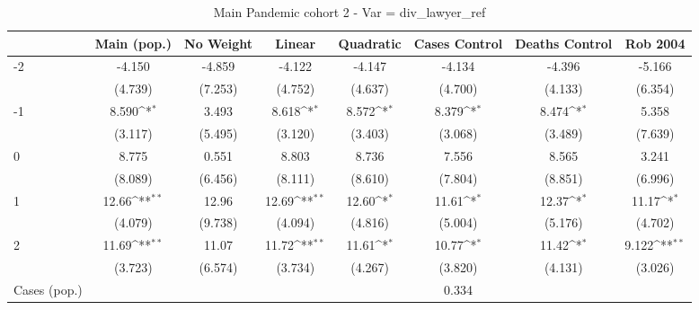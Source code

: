 \documentclass{article}
\begin{document}
{
\def\sym#1{\ifmmode^{#1}\else\(^{#1}\)\fi}
\begin{longtable}{l*{7}{c}}
\caption{Main Pandemic cohort 2 - Var = div\_lawyer\_ref}\\
\hline\hline\endfirsthead\hline\endhead\hline\endfoot\endlastfoot
                &\multicolumn{1}{c}{Main (pop.)}&\multicolumn{1}{c}{No Weight}&\multicolumn{1}{c}{Linear}&\multicolumn{1}{c}{Quadratic}&\multicolumn{1}{c}{Cases Control}&\multicolumn{1}{c}{Deaths Control}&\multicolumn{1}{c}{Rob 2004}\\
\hline
-2              &   -4.150         &   -4.859         &   -4.122         &   -4.147         &   -4.134         &   -4.396         &   -5.166         \\
                &  (4.739)         &  (7.253)         &  (4.752)         &  (4.637)         &  (4.700)         &  (4.133)         &  (6.354)         \\
-1              &    8.590\sym{*}  &    3.493         &    8.618\sym{*}  &    8.572\sym{*}  &    8.379\sym{*}  &    8.474\sym{*}  &    5.358         \\
                &  (3.117)         &  (5.495)         &  (3.120)         &  (3.403)         &  (3.068)         &  (3.489)         &  (7.639)         \\
0               &    8.775         &    0.551         &    8.803         &    8.736         &    7.556         &    8.565         &    3.241         \\
                &  (8.089)         &  (6.456)         &  (8.111)         &  (8.610)         &  (7.804)         &  (8.851)         &  (6.996)         \\
1               &    12.66\sym{**} &    12.96         &    12.69\sym{**} &    12.60\sym{*}  &    11.61\sym{*}  &    12.37\sym{*}  &    11.17\sym{*}  \\
                &  (4.079)         &  (9.738)         &  (4.094)         &  (4.816)         &  (5.004)         &  (5.176)         &  (4.702)         \\
2               &    11.69\sym{**} &    11.07         &    11.72\sym{**} &    11.61\sym{*}  &    10.77\sym{*}  &    11.42\sym{*}  &    9.122\sym{**} \\
                &  (3.723)         &  (6.574)         &  (3.734)         &  (4.267)         &  (3.820)         &  (4.131)         &  (3.026)         \\
Cases (pop.)    &                  &                  &                  &                  &    0.334         &                  &                  \\

\end{longtable}}
\end{document}
